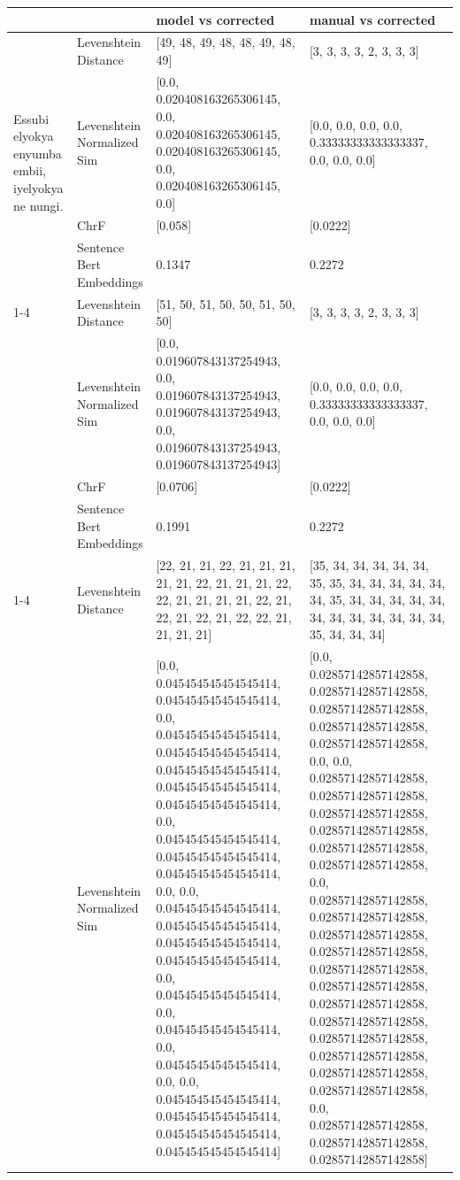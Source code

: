 \begin{tabular}{llll}
\toprule
 &  & model vs corrected & manual vs corrected \\
\midrule
\multirow[t]{4}{*}{Essubi elyokya enyumba embii, iyelyokya ne nungi.} & Levenshtein Distance & [49, 48, 49, 48, 48, 49, 48, 49] & [3, 3, 3, 3, 2, 3, 3, 3] \\
 & Levenshtein Normalized Sim & [0.0, 0.020408163265306145, 0.0, 0.020408163265306145, 0.020408163265306145, 0.0, 0.020408163265306145, 0.0] & [0.0, 0.0, 0.0, 0.0, 0.33333333333333337, 0.0, 0.0, 0.0] \\
 & ChrF & [0.058] & [0.0222] \\
 & Sentence Bert Embeddings & 0.1347 & 0.2272 \\
\cline{1-4}
\multirow[t]{4}{*}{Obulamu bulinga masanda bwoseleera, ogenda mumaaso.} & Levenshtein Distance & [51, 50, 51, 50, 50, 51, 50, 50] & [3, 3, 3, 3, 2, 3, 3, 3] \\
 & Levenshtein Normalized Sim & [0.0, 0.019607843137254943, 0.0, 0.019607843137254943, 0.019607843137254943, 0.0, 0.019607843137254943, 0.019607843137254943] & [0.0, 0.0, 0.0, 0.0, 0.33333333333333337, 0.0, 0.0, 0.0] \\
 & ChrF & [0.0706] & [0.0222] \\
 & Sentence Bert Embeddings & 0.1991 & 0.2272 \\
\cline{1-4}
\multirow[t]{4}{*}{Towakananga na musiru.} & Levenshtein Distance & [22, 21, 21, 22, 21, 21, 21, 21, 21, 22, 21, 21, 21, 22, 22, 21, 21, 21, 21, 22, 21, 22, 21, 22, 21, 22, 22, 21, 21, 21, 21] & [35, 34, 34, 34, 34, 34, 35, 35, 34, 34, 34, 34, 34, 34, 35, 34, 34, 34, 34, 34, 34, 34, 34, 34, 34, 34, 34, 35, 34, 34, 34] \\
 & Levenshtein Normalized Sim & [0.0, 0.045454545454545414, 0.045454545454545414, 0.0, 0.045454545454545414, 0.045454545454545414, 0.045454545454545414, 0.045454545454545414, 0.045454545454545414, 0.0, 0.045454545454545414, 0.045454545454545414, 0.045454545454545414, 0.0, 0.0, 0.045454545454545414, 0.045454545454545414, 0.045454545454545414, 0.045454545454545414, 0.0, 0.045454545454545414, 0.0, 0.045454545454545414, 0.0, 0.045454545454545414, 0.0, 0.0, 0.045454545454545414, 0.045454545454545414, 0.045454545454545414, 0.045454545454545414] & [0.0, 0.02857142857142858, 0.02857142857142858, 0.02857142857142858, 0.02857142857142858, 0.02857142857142858, 0.0, 0.0, 0.02857142857142858, 0.02857142857142858, 0.02857142857142858, 0.02857142857142858, 0.02857142857142858, 0.02857142857142858, 0.0, 0.02857142857142858, 0.02857142857142858, 0.02857142857142858, 0.02857142857142858, 0.02857142857142858, 0.02857142857142858, 0.02857142857142858, 0.02857142857142858, 0.02857142857142858, 0.02857142857142858, 0.02857142857142858, 0.02857142857142858, 0.0, 0.02857142857142858, 0.02857142857142858, 0.02857142857142858] \\

\end{tabular}
